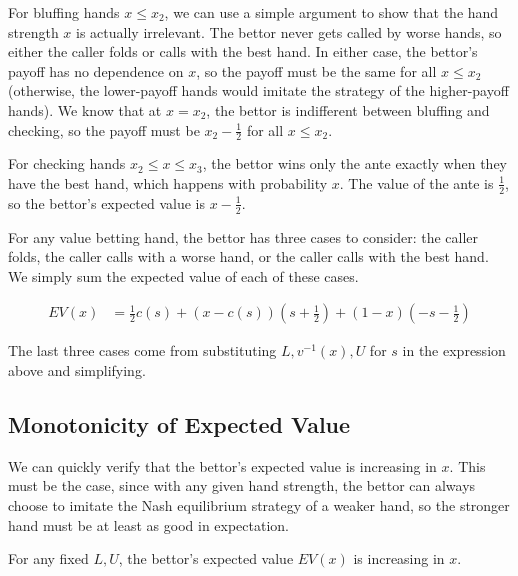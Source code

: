 \documentclass[../../main/main.tex]{subfiles}
\begin{document}
\begin{customproof}
    For bluffing hands $x \leq x_2$, we can use a simple argument to show that the hand strength $x$ is actually irrelevant. The bettor never gets called by worse hands, so either the caller folds or calls with the best hand. In either case, the bettor's payoff has no dependence on $x$, so the payoff must be the same for all $x \leq x_2$ (otherwise, the lower-payoff hands would imitate the strategy of the higher-payoff hands). We know that at $x=x_2$, the bettor is indifferent between bluffing and checking, so the payoff must be $x_2-\frac{1}{2}$ for all $x \leq x_2$.

    For checking hands $x_2 \leq x \leq x_3$, the bettor wins only the ante exactly when they have the best hand, which happens with probability $x$. The value of the ante is $\frac{1}{2}$, so the bettor's expected value is $x-\frac{1}{2}$.

    For any value betting hand, the bettor has three cases to consider: the caller folds, the caller calls with a worse hand, or the caller calls with the best hand. We simply sum the expected value of each of these cases.

    \begin{align*}
        EV(x) & = \frac{1}{2} c(s) + (x - c(s)) \left(s+\frac{1}{2}\right) + (1-x) \left(-s-\frac{1}{2}\right)
    \end{align*}

    The last three cases come from substituting $L, v^{-1}(x), U$ for $s$ in the expression above and simplifying.
\end{customproof}

\subsection{Monotonicity of Expected Value}

We can quickly verify that the bettor's expected value is increasing in $x$. This must be the case, since with any given hand strength, the bettor can always choose to imitate the Nash equilibrium strategy of a weaker hand, so the stronger hand must be at least as good in expectation.

\begin{theorem}
    \label{thm:ev_increasing}
    For any fixed $L, U$, the bettor's expected value $EV(x)$ is increasing in $x$.
\end{theorem}
\end{document}
